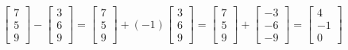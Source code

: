 \begin{align*}
\begin{bmatrix}
7 \\
5 \\
9
\end{bmatrix}
-
\begin{bmatrix}
3 \\
6 \\
9
\end{bmatrix}
=
\begin{bmatrix}
7 \\
5 \\
9
\end{bmatrix}
+ (-1)
\begin{bmatrix}
3 \\
6 \\
9
\end{bmatrix}
=
\begin{bmatrix}
7 \\
5 \\
9
\end{bmatrix}
+
\begin{bmatrix}
-3 \\
-6 \\
-9
\end{bmatrix}
=
\begin{bmatrix}
4 \\
-1 \\
0
\end{bmatrix}
\end{align*}

